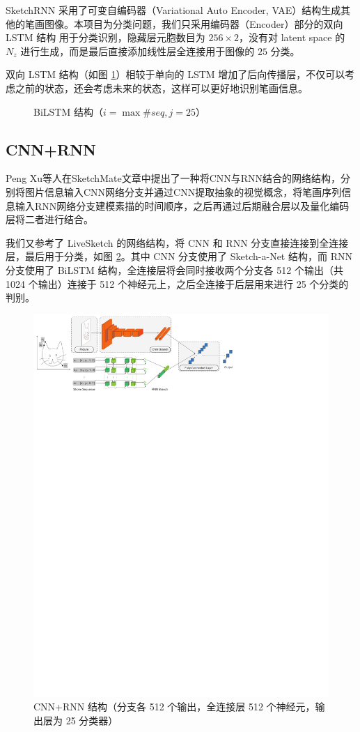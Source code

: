 SketchRNN \cite{sketchrnn} 采用了可变自编码器（Variational Auto Encoder, VAE）结构生成其他的笔画图像。本项目为分类问题，我们只采用编码器（Encoder）部分的双向 LSTM 结构 \cite{bilstm} 用于分类识别，隐藏层元胞数目为 $256\times 2$，没有对 latent  space 的 $N_z$ 进行生成，而是最后直接添加线性层全连接用于图像的 $25$ 分类。

双向 LSTM 结构（如图 \ref{fig:bilstm}）相较于单向的 LSTM 增加了后向传播层，不仅可以考虑之前的状态，还会考虑未来的状态，这样可以更好地识别笔画信息。


\begin{figure}[ht]
    \centering
    
    \caption{BiLSTM 结构（$i=\max{\#seq},j=25$）}
    \label{fig:bilstm}
\end{figure}

\subsection{CNN+RNN}
Peng Xu等人在SketchMate\cite{sketchmate}文章中提出了一种将CNN与RNN结合的网络结构，分别将图片信息输入CNN网络分支并通过CNN提取抽象的视觉概念，将笔画序列信息输入RNN网络分支建模素描的时间顺序，之后再通过后期融合层以及量化编码层将二者进行结合。

我们又参考了 LiveSketch\cite{livesketch} 的网络结构，将 CNN 和 RNN 分支直接连接到全连接层，最后用于分类，如图 \ref{fig:cnnrnn}。其中 CNN 分支使用了 Sketch-a-Net 结构，而 RNN 分支使用了 BiLSTM 结构，全连接层将会同时接收两个分支各 512 个输出（共 1024 个输出）连接于 512 个神经元上，之后全连接于后层用来进行 25 个分类的判别。

\begin{figure}[ht]
    \centering
    \includegraphics{img/cnnrnn.pdf}
    \caption{CNN+RNN 结构（分支各 512 个输出，全连接层 512 个神经元，输出层为 25 分类器）}
    \label{fig:cnnrnn}
\end{figure}


